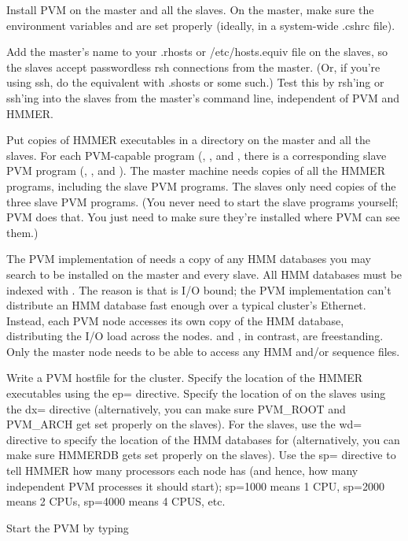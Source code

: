 Install PVM on the master and all the slaves. On the master, make sure
the environment variables  and  are
set properly (ideally, in a system-wide .cshrc file).

Add the master's name to your .rhosts or /etc/hosts.equiv file on the
slaves, so the slaves accept passwordless rsh connections from the
master. (Or, if you're using ssh, do the equivalent with .shosts or
some such.) Test this by rsh'ing or ssh'ing into the slaves from the
master's command line, independent of PVM and HMMER.

Put copies of HMMER executables in a directory on the master and all
the slaves. For each PVM-capable program (,
, and , there is a corresponding slave
PVM program (, , and
). The master machine needs copies of all the HMMER
programs, including the slave PVM programs.  The slaves only need
copies of the three slave PVM programs. (You never need to start the
slave programs yourself; PVM does that. You just need to make sure
they're installed where PVM can see them.)

The PVM implementation of  needs a copy of any HMM
databases you may search to be installed on the master and every
slave. All HMM databases must be indexed with . The
reason is that  is I/O bound; the PVM implementation
can't distribute an HMM database fast enough over a typical cluster's
Ethernet. Instead, each PVM node accesses its own copy of the HMM
database, distributing the I/O load across the nodes.
 and , in contrast, are
freestanding. Only the master node needs to be able to access any HMM
and/or sequence files.

Write a PVM hostfile for the cluster. Specify the location of the
HMMER executables using the ep= directive. Specify the location of
 on the slaves using the dx= directive (alternatively, you
can make sure PVM\_ROOT and PVM\_ARCH get set properly on the
slaves). For the slaves, use the wd= directive to specify the location
of the HMM databases for  (alternatively, you can make
sure HMMERDB gets set properly on the slaves). Use the sp= directive
to tell HMMER how many processors each node has (and hence, how many
independent PVM processes it should start); sp=1000 means 1 CPU,
sp=2000 means 2 CPUs, sp=4000 means 4 CPUS, etc.

Start the PVM by typing

